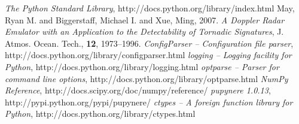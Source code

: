 \documentclass[twocolumn]{article}
\begin{document}
\begin{thebibliography}{9}
                \emph{The Python Standard Library},
                http://docs.python.org/library/index.html
                May, Ryan M. and Biggerstaff, Michael I. and Xue, Ming, 2007.
                \emph{A Doppler Radar Emulator with an Application to the Detectability of Tornadic Signatures},
                J. Atmos. Ocean. Tech., \textbf{12}, 1973--1996.
                \emph{ConfigParser -- Configuration file parser},
                http://docs.python.org/library/configparser.html
                \emph{logging -- Logging facility for Python},
                http://docs.python.org/library/logging.html
                \emph{optparse -- Parser for command line options},
                http://docs.python.org/library/optparse.html
                \emph{NumPy Reference},
                http://docs.scipy.org/doc/numpy/reference/
                \emph{pupynere 1.0.13},
                http://pypi.python.org/pypi/pupynere/
                \emph{ctypes -- A foreign function library for Python},
                http://docs.python.org/library/ctypes.html
\end{thebibliography}
\end{document}
